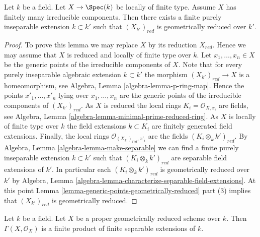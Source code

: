 \begin{lemma}
\label{lemma-finite-extension-geometrically-reduced}
Let $k$ be a field.
Let $X \to \Spec(k)$ be locally of finite type.
Assume $X$ has finitely many irreducible components.
Then there exists a finite purely inseparable extension $k \subset k'$
such that $(X_{k'})_{red}$ is geometrically reduced over $k'$.
\end{lemma}

\begin{proof}
To prove this lemma we may replace $X$ by its reduction $X_{red}$.
Hence we may assume that $X$ is reduced and locally of finite type
over $k$.
Let $x_1, \ldots, x_n \in X$ be the generic points of the irreducible
components of $X$.
Note that for every purely inseparable algebraic extension $k \subset k'$
the morphism $(X_{k'})_{red} \to X$ is a homeomorphism, see
Algebra, Lemma \ref{algebra-lemma-p-ring-map}. Hence the points
$x'_1, \ldots, x'_n$ lying over $x_1, \ldots, x_n$ are the generic
points of the irreducible components of $(X_{k'})_{red}$.
As $X$ is reduced the local rings $K_i = \mathcal{O}_{X, x_i}$ are fields, see
Algebra, Lemma \ref{algebra-lemma-minimal-prime-reduced-ring}.
As $X$ is locally of finite type over $k$ the field extensions
$k \subset K_i$ are finitely generated field extensions.
Finally, the local rings $\mathcal{O}_{(X_{k'})_{red}, x'_i}$ are the
fields $(K_i \otimes_k k')_{red}$. By
Algebra, Lemma \ref{algebra-lemma-make-separable}
we can find a finite purely inseparable extension $k \subset k'$
such that $(K_i \otimes_k k')_{red}$ are separable field
extensions of $k'$. In particular each $(K_i \otimes_k k')_{red}$
is geometrically reduced over $k'$ by
Algebra, Lemma \ref{algebra-lemma-characterize-separable-field-extensions}.
At this point
Lemma \ref{lemma-generic-points-geometrically-reduced} part (3)
implies that $(X_{k'})_{red}$ is geometrically reduced.
\end{proof}

\begin{lemma}
\label{lemma-proper-geometrically-reduced-global-sections}
Let $k$ be a field. Let $X$ be a proper geometrically reduced
scheme over $k$. Then $\Gamma(X, \mathcal{O}_X)$ is a finite
product of finite separable extensions of $k$.
\end{lemma}

